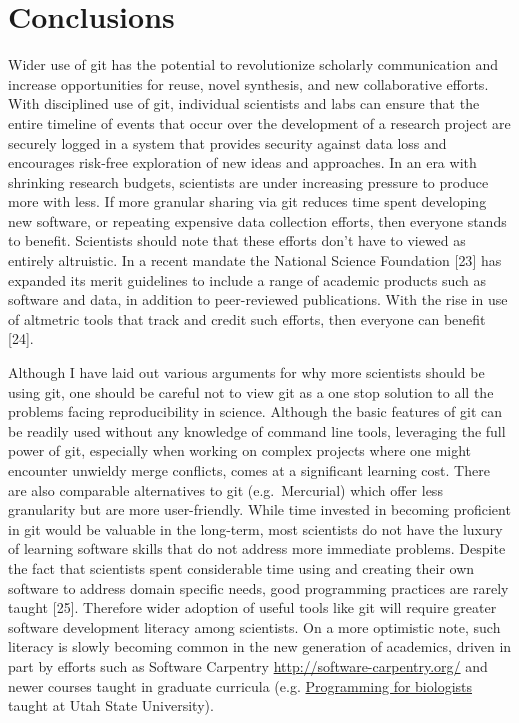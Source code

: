 \documentclass[]{article}
\begin{document}
\section{Conclusions}

Wider use of git has the potential to revolutionize scholarly
communication and increase opportunities for reuse, novel synthesis, and
new collaborative efforts. With disciplined use of git, individual
scientists and labs can ensure that the entire timeline of events that
occur over the development of a research project are securely logged in
a system that provides security against data loss and encourages
risk-free exploration of new ideas and approaches. In an era with
shrinking research budgets, scientists are under increasing pressure to
produce more with less. If more granular sharing via git reduces time
spent developing new software, or repeating expensive data collection
efforts, then everyone stands to benefit. Scientists should note that
these efforts don't have to viewed as entirely altruistic. In a recent
mandate the National Science Foundation {[}23{]} has expanded its merit
guidelines to include a range of academic products such as software and
data, in addition to peer-reviewed publications. With the rise in use of
altmetric tools that track and credit such efforts, then everyone can
benefit {[}24{]}.

Although I have laid out various arguments for why more scientists
should be using git, one should be careful not to view git as a one stop
solution to all the problems facing reproducibility in science. Although
the basic features of git can be readily used without any knowledge of
command line tools, leveraging the full power of git, especially when
working on complex projects where one might encounter unwieldy merge
conflicts, comes at a significant learning cost. There are also
comparable alternatives to git (e.g.~Mercurial) which offer less
granularity but are more user-friendly. While time invested in becoming
proficient in git would be valuable in the long-term, most scientists do
not have the luxury of learning software skills that do not address more
immediate problems. Despite the fact that scientists spent considerable
time using and creating their own software to address domain specific
needs, good programming practices are rarely taught {[}25{]}. Therefore
wider adoption of useful tools like git will require greater software
development literacy among scientists. On a more optimistic note, such
literacy is slowly becoming common in the new generation of academics,
driven in part by efforts such as Software Carpentry
\href{http://software-carpentry.org/}{http://software-carpentry.org/}
and newer courses taught in graduate curricula (e.g.
\href{http://www.programmingforbiologists.org/}{Programming for
biologists} taught at Utah State University).
\end{document}

